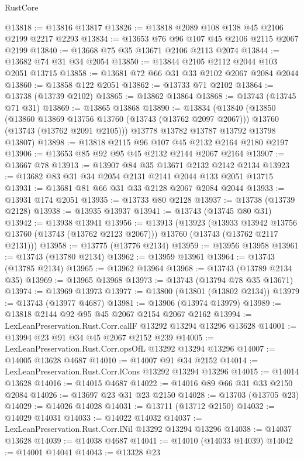 \begin{lexlean}{RustCore}
\begin{coremodule}
@13818 := @13816 @13817
@13826 := @13818 @2089 @108 @138 @45 @2106 @2199 @2217 @2293
@13834 := @13653 @76 @96 @107 @45 @2106 @2115 @2067 @2199
@13840 := @13668 @75 @35 @13671 @2106 @2113 @2074
@13844 := @13682 @74 @31 @34 @2054
@13850 := @13844 @2105 @2112 @2044 @103 @2051 @13715
@13858 := @13681 @72 @66 @31 @33 @2102 @2067 @2084 @2044
@13860 := @13858 @122 @2051
@13862 := @13733 @71 @2102
@13864 := @13738 (@13739 @2102)
@13865 := @13862 @13864
@13868 := @13743 (@13745 @71 @31)
@13869 := @13865 @13868
@13890 := @13834
    (@13840
      (@13850
        (@13860 @13869 @13756 @13760 (@13743 (@13762 @2097 @2067)))
        @13760
        (@13743 (@13762 @2091 @2105)))
      @13778
      @13782
      @13787
      @13792
      @13798
      @13807)
@13898 := @13818 @2115 @96 @107 @45 @2132 @2164 @2180 @2197
@13906 := @13653 @85 @92 @95 @45 @2132 @2144 @2067 @2164
@13907 := @13667 @78
@13913 := @13907 @84 @35 @13671 @2132 @2142 @2134
@13923 := @13682 @83 @31 @34 @2054 @2131 @2141 @2044 @133 @2051 @13715
@13931 := @13681 @81 @66 @31 @33 @2128 @2067 @2084 @2044
@13933 := @13931 @174 @2051
@13935 := @13733 @80 @2128
@13937 := @13738 (@13739 @2128)
@13938 := @13935 @13937
@13941 := @13743 (@13745 @80 @31)
@13942 := @13938 @13941
@13956 := @13913
    (@13923
      (@13933 @13942 @13756 @13760 (@13743 (@13762 @2123 @2067)))
      @13760
      (@13743 (@13762 @2117 @2131)))
@13958 := @13775 (@13776 @2134)
@13959 := @13956 @13958
@13961 := @13743 (@13780 @2134)
@13962 := @13959 @13961
@13964 := @13743 (@13785 @2134)
@13965 := @13962 @13964
@13968 := @13743 (@13789 @2134 @35)
@13969 := @13965 @13968
@13973 := @13743 (@13794 @78 @35 @13671)
@13974 := @13969 @13973
@13977 := @13800 (@13801 (@13802 @2134))
@13979 := @13743 (@13977 @4687)
@13981 := @13906 (@13974 @13979)
@13989 := @13818 @2144 @92 @95 @45 @2067 @2154 @2067 @2162
@13994 := LexLeanPreservation.Rust.Corr.callF @13292 @13294 @13296 @13628
@14001 := @13994 @23 @91 @34 @45 @2067 @2152 @239
@14005 := LexLeanPreservation.Rust.Corr.opsOfL @13292 @13294 @13296
@14007 := @14005 @13628 @4687
@14010 := @14007 @91 @34 @2152
@14014 := LexLeanPreservation.Rust.Corr.lCons @13292 @13294 @13296
@14015 := @14014 @13628
@14016 := @14015 @4687
@14022 := @14016 @89 @66 @31 @33 @2150 @2084
@14026 := @13697 @23 @31 @23 @2150
@14028 := @13703 (@13705 @23)
@14029 := @14026 @14028
@14031 := @13711 (@13712 @2150)
@14032 := @14029 @14031
@14033 := @14022 @14032
@14037 := LexLeanPreservation.Rust.Corr.lNil @13292 @13294 @13296
@14038 := @14037 @13628
@14039 := @14038 @4687
@14041 := @14010 (@14033 @14039)
@14042 := @14001 @14041
@14043 := @13328 @23

\end{coremodule}
\end{lexlean}
